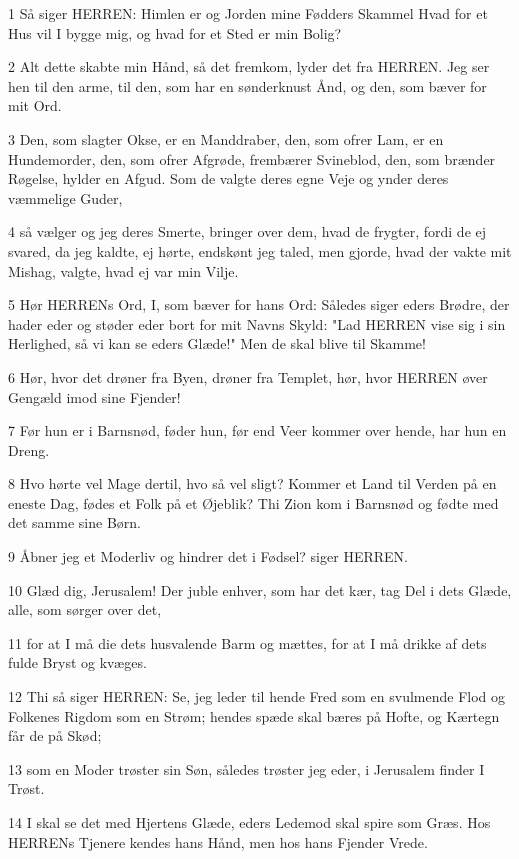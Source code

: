\par 1 Så siger HERREN: Himlen er og Jorden mine Fødders Skammel Hvad for et Hus vil I bygge mig, og hvad for et Sted er min Bolig?
\par 2 Alt dette skabte min Hånd, så det fremkom, lyder det fra HERREN. Jeg ser hen til den arme, til den, som har en sønderknust Ånd, og den, som bæver for mit Ord.
\par 3 Den, som slagter Okse, er en Manddraber, den, som ofrer Lam, er en Hundemorder, den, som ofrer Afgrøde, frembærer Svineblod, den, som brænder Røgelse, hylder en Afgud. Som de valgte deres egne Veje og ynder deres væmmelige Guder,
\par 4 så vælger og jeg deres Smerte, bringer over dem, hvad de frygter, fordi de ej svared, da jeg kaldte, ej hørte, endskønt jeg taled, men gjorde, hvad der vakte mit Mishag, valgte, hvad ej var min Vilje.
\par 5 Hør HERRENs Ord, I, som bæver for hans Ord: Således siger eders Brødre, der hader eder og støder eder bort for mit Navns Skyld: "Lad HERREN vise sig i sin Herlighed, så vi kan se eders Glæde!" Men de skal blive til Skamme!
\par 6 Hør, hvor det drøner fra Byen, drøner fra Templet, hør, hvor HERREN øver Gengæld imod sine Fjender!
\par 7 Før hun er i Barnsnød, føder hun, før end Veer kommer over hende, har hun en Dreng.
\par 8 Hvo hørte vel Mage dertil, hvo så vel sligt? Kommer et Land til Verden på en eneste Dag, fødes et Folk på et Øjeblik? Thi Zion kom i Barnsnød og fødte med det samme sine Børn.
\par 9 Åbner jeg et Moderliv og hindrer det i Fødsel? siger HERREN.
\par 10 Glæd dig, Jerusalem! Der juble enhver, som har det kær, tag Del i dets Glæde, alle, som sørger over det,
\par 11 for at I må die dets husvalende Barm og mættes, for at I må drikke af dets fulde Bryst og kvæges.
\par 12 Thi så siger HERREN: Se, jeg leder til hende Fred som en svulmende Flod og Folkenes Rigdom som en Strøm; hendes spæde skal bæres på Hofte, og Kærtegn får de på Skød;
\par 13 som en Moder trøster sin Søn, således trøster jeg eder, i Jerusalem finder I Trøst.
\par 14 I skal se det med Hjertens Glæde, eders Ledemod skal spire som Græs. Hos HERRENs Tjenere kendes hans Hånd, men hos hans Fjender Vrede.
